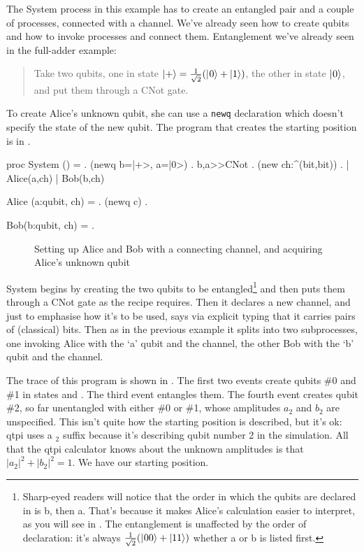\documentclass[11pt,a4paper]{book}
\makeatletter
\newcommand{\mvb}[1]{\begin{myverbbox}[\ifthenelse{\equal{\the\verbatim@line}{}}{\vspace{-5pt}}{}]{#1}}
\newcommand{\verbtt}[1]{\texttt{\small{}#1}}
\makeatother
\begin{document}
The System process in this example has to create an entangled pair and a couple of processes, connected with a channel. We've already seen how to create qubits and how to invoke processes and connect them. Entanglement we've already seen in the full-adder example:
\begin{quote}
Take two qubits, one in state $\plus=\frac{1}{\sqrt{2}}(\zero+\one)$, the other in state $|\hspace{0.5pt}0\rangle$, and put them through a CNot gate.
\end{quote}
To create Alice's unknown qubit, she can use a \verbtt{newq} declaration which doesn't specify the state of the new qubit. The program that creates the starting position is in .

\mvb {\teleportinit}
proc System () = 
        . (newq b=|+>, a=|0>)  
        . b,a>>CNot 
        . (new ch:^(bit,bit))
        . | Alice(a,ch) | Bob(b,ch)

     Alice (a:qubit, ch) = 
        . (newq c) 
        .  

     Bob(b:qubit, ch) = 
        . 
\end{myverbbox}
\begin{figure}
\centering
\teleportinit
\caption{Setting up Alice and Bob with a connecting channel, and acquiring Alice's unknown qubit}
\end{figure}

System begins by creating the two qubits to be entangled\footnote{Sharp-eyed readers will notice that the order in which the qubits are declared in  is b, then a. That's because it makes Alice's calculation easier to interpret, as you will see in . The entanglement is unaffected by the order of declaration: it's always $\frac{1}{\sqrt{2}}(|\hspace{0.5pt}00\rangle+|11\rangle)$ whether a or b is listed first.} and then puts them through a CNot gate as the recipe requires. Then it declares a new channel, and just to emphasise how it's to be used, says via explicit typing that it carries pairs of (classical) bits. Then as in the previous example it splits into two subprocesses, one invoking Alice with the `a' qubit and the channel, the other Bob with the `b' qubit and the channel.  

The trace of this program is shown in . The first two events create qubits \#0 and \#1 in states \plus{} and \zero{}. The third event entangles them. The fourth event creates qubit \#2, so far unentangled with either \#0 or \#1, whose amplitudes $a_{2}$ and $b_{2}$ are unspecified. This isn't quite how the starting position is described, but it's ok: qtpi uses a $_{2}$ suffix because it's describing qubit number 2 in the simulation. All that the qtpi calculator knows about the unknown amplitudes is that $|a_{2}|^{2}+|b_{2}|^{2}=1$. We have our starting position. 
\end{document}
